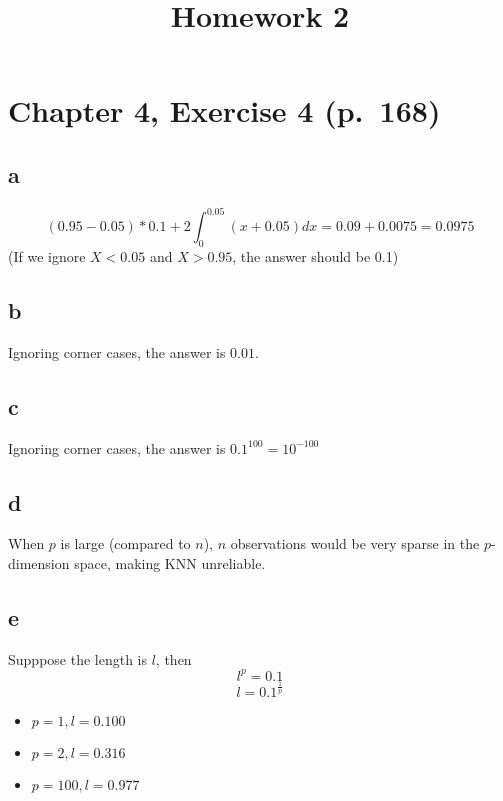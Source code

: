 \documentclass[11pt]{article}
\title{Homework 2}
\begin{document}
    
    
    \maketitle
    
    

    
    \hypertarget{chapter-4-exercise-4-p.168}{%
\section{Chapter 4, Exercise 4
(p.~168)}\label{chapter-4-exercise-4-p.168}}

\hypertarget{a}{%
\subsection{a}\label{a}}

\[
(0.95-0.05)*0.1+2\int_{0}^{0.05} (x+0.05)dx = 0.09+0.0075 = 0.0975
\] (If we ignore \(X<0.05\) and \(X>0.95\), the answer should be 0.1)

\hypertarget{b}{%
\subsection{b}\label{b}}

Ignoring corner cases, the answer is \(0.01\).

\hypertarget{c}{%
\subsection{c}\label{c}}

Ignoring corner cases, the answer is \(0.1^{100} = 10^{-100}\)

\hypertarget{d}{%
\subsection{d}\label{d}}

When \(p\) is large (compared to \(n\)), \(n\) observations would be
very sparse in the \(p\)-dimension space, making KNN unreliable.

\hypertarget{e}{%
\subsection{e}\label{e}}

Supppose the length is \(l\), then \[
l^{p} = 0.1 
\] \[
l = {0.1}^{\frac{1}{p}}
\]

\begin{itemize}
\item
  \(p = 1, l = 0.100\)
\item
  \(p = 2, l = 0.316\)
\item
  \(p = 100, l = 0.977\)
\end{itemize}
\end{document}
